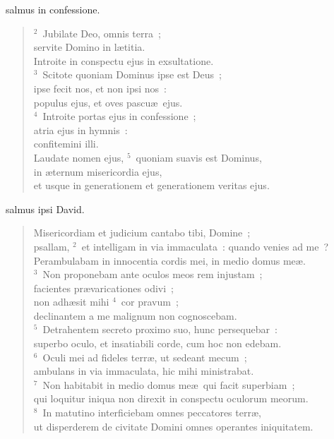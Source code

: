 \bchapter
{}salmus in confessione.
\begin{flushleft}\begin{verse}\vspace{6pt}${}^{2}$~Jubilate Deo, omnis terra~;\\ servite Domino in l\ae titia.\\ Introite in conspectu ejus in exsultatione.\\
${}^{3}$~Scitote quoniam Dominus ipse est Deus~;\\ ipse fecit nos, et non ipsi nos~:\\ populus ejus, et oves pascu\ae\ ejus.\\
${}^{4}$~Introite portas ejus in confessione~;\\ atria ejus in hymnis~:\\ confitemini illi.\\ Laudate nomen ejus,
${}^{5}$~quoniam suavis est Dominus,\\ in \ae ternum misericordia ejus,\\ et usque in generationem et generationem veritas ejus.\end{verse}\end{flushleft}



\bchapter
{}salmus ipsi David. \begin{flushleft}\begin{verse}\vspace{6pt}Misericordiam et judicium cantabo tibi, Domine~;\\ psallam,
${}^{2}$~et intelligam in via immaculata~: quando venies ad me~?\\ Perambulabam in innocentia cordis mei, in medio domus me\ae .\\
${}^{3}$~Non proponebam ante oculos meos rem injustam~;\\ facientes pr\ae varicationes odivi~;\\ non adh\ae sit mihi
${}^{4}$~cor pravum~;\\ declinantem a me malignum non cognoscebam.\\
${}^{5}$~Detrahentem secreto proximo suo, hunc persequebar~:\\ superbo oculo, et insatiabili corde, cum hoc non edebam.\\
${}^{6}$~Oculi mei ad fideles terr\ae , ut sedeant mecum~;\\ ambulans in via immaculata, hic mihi ministrabat.\\
${}^{7}$~Non habitabit in medio domus me\ae\ qui facit superbiam~;\\ qui loquitur iniqua non direxit in conspectu oculorum meorum.\\
${}^{8}$~In matutino interficiebam omnes peccatores terr\ae ,\\ ut disperderem de civitate Domini omnes operantes iniquitatem.\end{verse}\end{flushleft}



